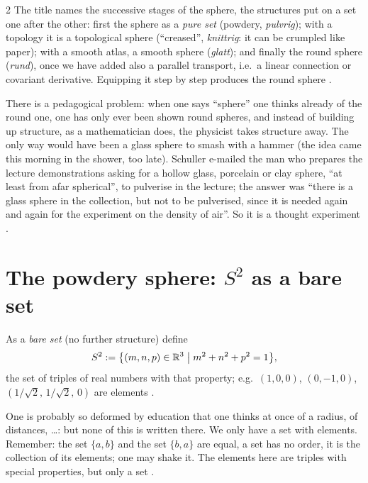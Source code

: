 \begin{paracol}{2}
The title names the successive stages of the sphere, the structures put on a set one after the other: first the sphere as a \emph{pure
set} (powdery, \emph{pulvrig}); with a topology it is a topological sphere (``creased'', \emph{knittrig}: it can be crumpled like
paper); with a smooth atlas, a smooth sphere (\emph{glatt}); and finally the round sphere (\emph{rund}), once we have added also a
parallel transport, i.e.\ a linear connection or covariant derivative. Equipping it step by step produces the round sphere
.

There is a pedagogical problem: when one says ``sphere'' one thinks already of the round one, one has only ever been shown round
spheres, and instead of building up structure, as a mathematician does, the physicist takes structure away. The only way would have been
a glass sphere to smash with a hammer (the idea came this morning in the shower, too late). Schuller e-mailed the man who prepares
the lecture demonstrations asking for a hollow glass, porcelain or clay sphere, ``at least from afar spherical'', to pulverise
in the lecture; the answer was ``there is a glass sphere in the collection, but not to be pulverised, since it is needed again and again
for the experiment on the density of air''. So it is a thought experiment .

\section{The powdery sphere: $S^2$ as a bare set}\label{sec:sp-powder}

\begin{definition}\label{def:sp-set}
As a \emph{bare set} (no further structure) define
\[
  S^2:=\bigl\{(m,n,p)\in\mathbb{R}^3\;\big|\;m^2+n^2+p^2=1\bigr\},
\]
the set of triples of real numbers with that property; e.g.\ $(1,0,0)$, $(0,-1,0)$, $(1/\sqrt2,\,1/\sqrt2,\,0)$ are elements
.
\end{definition}
One is probably so deformed by education that one thinks at once of a radius, of distances, \dots: but none of this is written there.
We only have a set with elements. Remember: the set $\{a,b\}$ and the set $\{b,a\}$ are equal, a set has no order, it is the
collection of its elements; one may shake it. The elements here are triples with special properties, but only a set
.


\end{paracol}
